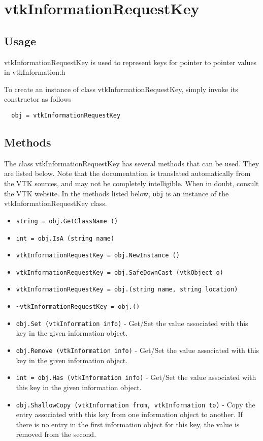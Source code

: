 \section{vtkInformationRequestKey}

\subsection{Usage}

 vtkInformationRequestKey is used to represent keys for pointer
 to pointer values in vtkInformation.h

To create an instance of class vtkInformationRequestKey, simply
invoke its constructor as follows
\begin{verbatim}
  obj = vtkInformationRequestKey
\end{verbatim}
\subsection{Methods}

The class vtkInformationRequestKey has several methods that can be used.
  They are listed below.
Note that the documentation is translated automatically from the VTK sources,
and may not be completely intelligible.  When in doubt, consult the VTK website.
In the methods listed below, \verb|obj| is an instance of the vtkInformationRequestKey class.
\begin{itemize}
\item  \verb|string = obj.GetClassName ()|

\item  \verb|int = obj.IsA (string name)|

\item  \verb|vtkInformationRequestKey = obj.NewInstance ()|

\item  \verb|vtkInformationRequestKey = obj.SafeDownCast (vtkObject o)|

\item  \verb|vtkInformationRequestKey = obj.(string name, string location)|

\item  \verb|~vtkInformationRequestKey = obj.()|

\item  \verb|obj.Set (vtkInformation info)| -  Get/Set the value associated with this key in the given
 information object.

\item  \verb|obj.Remove (vtkInformation info)| -  Get/Set the value associated with this key in the given
 information object.

\item  \verb|int = obj.Has (vtkInformation info)| -  Get/Set the value associated with this key in the given
 information object.

\item  \verb|obj.ShallowCopy (vtkInformation from, vtkInformation to)| -  Copy the entry associated with this key from one information
 object to another.  If there is no entry in the first information
 object for this key, the value is removed from the second.

\end{itemize}
